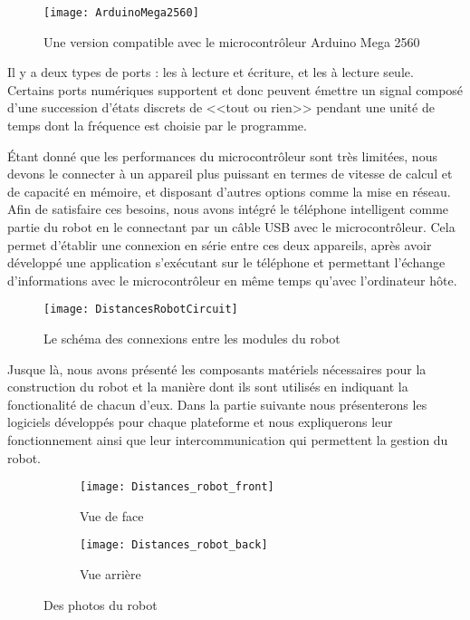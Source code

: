 \begin{figure}[H]
\centering
\texttt{[image: ArduinoMega2560]}
\caption{Une version compatible avec le microcontrôleur Arduino Mega 2560}
\end{figure}

Il y a deux types de ports : les  à lecture et
écriture, et les  à lecture seule. Certains ports
numériques supportent  et donc peuvent
émettre un signal composé d'une succession d'états discrets de <<tout ou rien>>
pendant une unité de temps dont la fréquence est choisie par le programme.

Étant donné que les performances du microcontrôleur sont très limitées, nous
devons le connecter à un appareil plus puissant en termes de vitesse
de calcul et de capacité en mémoire, et disposant d'autres options comme la
mise en réseau. Afin de satisfaire ces besoins, nous avons intégré le téléphone
intelligent  comme partie du robot en le connectant
par un câble USB avec le microcontrôleur. Cela permet d'établir une connexion en série entre
ces deux appareils, après avoir développé une application s'exécutant
sur le téléphone et permettant l'échange d'informations avec le microcontrôleur
en même temps qu'avec l'ordinateur hôte.

\begin{figure}[H]
\centering
\texttt{[image: DistancesRobotCircuit]}
\caption{Le schéma des connexions entre les modules du robot}
\end{figure}

Jusque là, nous avons présenté les composants matériels nécessaires pour la
construction du robot et la manière dont ils sont utilisés en indiquant la
fonctionalité de chacun d'eux. Dans la partie suivante nous présenterons les
logiciels développés pour chaque plateforme et nous expliquerons leur fonctionnement
ainsi que leur intercommunication qui permettent la gestion du robot.

\begin{figure}[h]
\begin{center}
  \begin{subfigure}{0.49\textwidth}
    \texttt{[image: Distances\_robot\_front]}
    \caption{Vue de face}
  \end{subfigure}
  \hfill
  \begin{subfigure}{0.49\textwidth}
    \texttt{[image: Distances\_robot\_back]}
    \caption{Vue arrière}
  \end{subfigure}
  \caption{Des photos du robot}
\end{center}
\end{figure}

